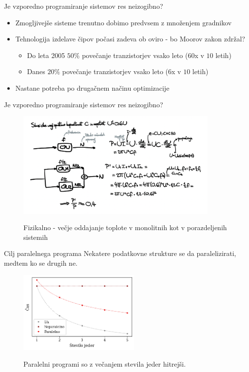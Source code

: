 \documentclass{beamer}
\begin{document}
\begin{frame}{Je vzporedno programiranje sistemov res neizogibno?}
    \begin{itemize}
        \item Zmogljivej\v se sisteme trenutno dobimo predvsem z mno\v zenjem gradnikov
        \item Tehnologija izdelave \v cipov po\v casi zadeva ob oviro - bo Moorov zakon zdr\v zal?
        \begin{itemize}
            \item Do leta 2005 $50\%$ pove\v canje tranzistorjev vsako leto ($60$x v $10$ letih)
            \item Danes $20\%$ pove\v canje tranzistorjev vsako leto ($6$x v $10$ letih)
        \end{itemize}
        \item Nastane potreba po druga\v cnem na\v cinu optimizacije
    \end{itemize}
\end{frame}

\begin{frame}{Je vzporedno programiranje sistemov res neizogibno?}
    \begin{figure}[h!]
    \centering
    \caption{Fizikalno - ve\v cje oddajanje toplote v monolitnih kot v porazdeljenih sistemih}
    \includegraphics[width=10cm]{slike/paralelizacija-fizikalno.png}
    \label{fig:paralelizacija-fizikalno}
    \end{figure}
\end{frame}

\begin{frame}{Cilj paralelnega programa}
    Nekatere podatkovne strukture se da paralelizirati, medtem ko se drugih ne.
    \begin{figure}
    \caption{Paralelni programi so z ve\v canjem stevila jeder hitrej\v si.}
    \includegraphics[width=6cm]{slike/cilj-casovne-zahtevnosti-paralelizacije.png}
    \label{fig:cilj-casovne-zahtevnosti-paralelizacije}
    \end{figure}
\end{frame}
\end{document}
